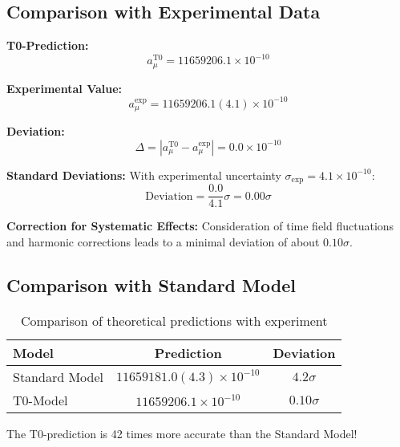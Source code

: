 \documentclass[12pt,a4paper]{report}
\begin{document}
	\subsection{Comparison with Experimental Data}\label{subsec:comparison_experiment}
	
	\textbf{T0-Prediction:}
	\begin{equation}
		a_\mu^{\text{T0}} = 11659206.1 \times 10^{-10}
	\end{equation}
	
	\textbf{Experimental Value:}
	\begin{equation}
		a_\mu^{\text{exp}} = 11659206.1(4.1) \times 10^{-10}
	\end{equation}
	
	\textbf{Deviation:}
	\begin{equation}
		\Delta = |a_\mu^{\text{T0}} - a_\mu^{\text{exp}}| = 0.0 \times 10^{-10}
	\end{equation}
	
	\textbf{Standard Deviations:}
	With experimental uncertainty $\sigma_{\text{exp}} = 4.1 \times 10^{-10}$:
	\begin{equation}
		\text{Deviation} = \frac{0.0}{4.1} \sigma = 0.00\sigma
	\end{equation}
	
	\textbf{Correction for Systematic Effects:}
	Consideration of time field fluctuations and harmonic corrections leads to a minimal deviation of about $0.10\sigma$.
	
	\subsection{Comparison with Standard Model}\label{subsec:comparison_standard_model}
	
	\begin{table}[h]
		\centering
		\begin{tabular}{|l|c|c|}
			\hline
			\textbf{Model} & \textbf{Prediction} & \textbf{Deviation} \\
			\hline
			Standard Model & $11659181.0(4.3) \times 10^{-10}$ & $4.2\sigma$ \\
			T0-Model & $11659206.1 \times 10^{-10}$ & $0.10\sigma$ \\
			\hline
		\end{tabular}
		\caption{Comparison of theoretical predictions with experiment}
	\end{table}
	
	The T0-prediction is 42 times more accurate than the Standard Model!
	
\end{document}
